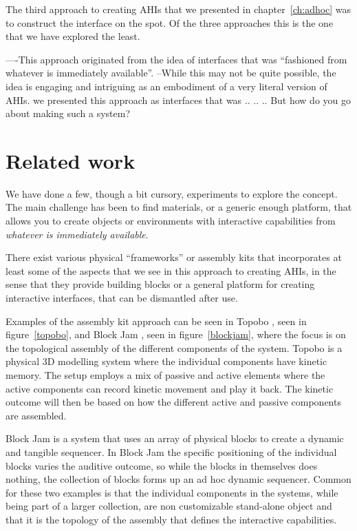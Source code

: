 \label{ch:prototype3}
The third approach to creating AHIs that we presented in chapter~\ref{ch:adhoc} was to construct the interface on the spot.
Of the three approaches this is the one that we have explored the least.

----This approach originated from the idea of interfaces that was ``fashioned from whatever is immediately available''.
--While this may not be quite possible, the idea is engaging and intriguing as an embodiment of a very literal version of AHIs. 
we presented this approach as interfaces that was .. .. .. 
But how do you go about making such a system?

\section{Related work}
We have done a few, though a bit cursory, experiments to explore the concept.
The main challenge has been to find materials, or a generic enough platform, that allows you to create objects or environments with interactive capabilities from \emph{whatever is immediately available}. 

There exist various physical ``frameworks'' or assembly kits that incorporates at least some of the aspects that we see in this approach to creating AHIs, in the sense that they provide building blocks or a general platform for creating interactive interfaces, that can be dismantled after use.

Examples of the assembly kit approach can be seen in Topobo \citep{raffle2004topobo}, seen in figure~\ref{topobo}, and Block Jam \citep{newton2003block}, seen in figure~\ref{blockjam}, where the focus is on the topological assembly of the different components of the system. 
Topobo is a physical 3D modelling system where the individual components have kinetic memory. 
The setup employs a mix of passive and active elements where the active components can record kinetic movement and play it back.
The kinetic outcome will then be based on how the different active and passive components are assembled.

Block Jam is a system that uses an array of physical blocks to create a dynamic and tangible sequencer.
In Block Jam the specific positioning of the individual blocks varies the auditive outcome, so while the blocks in themselves does nothing, the collection of blocks forms up an ad hoc dynamic sequencer.
Common for these two examples is that the individual components in the systems, while being part of a larger collection, are non customizable stand-alone object and that it is the topology of the assembly that defines the interactive capabilities.

